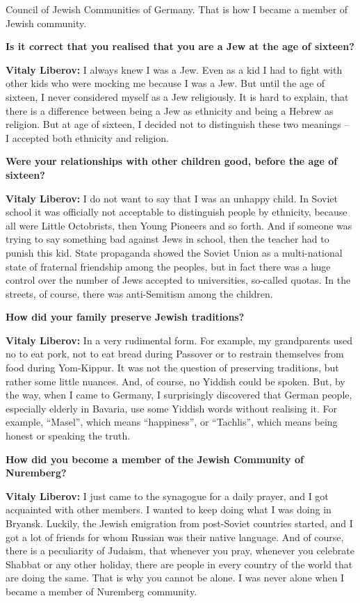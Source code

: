 Council of Jewish Communities of Germany. That is how I became a member of Jewish community.  

\textbf{Is it correct that you realised that you are a Jew at the age of sixteen?} 

\textbf{Vitaly Liberov:} I always knew I was a Jew. Even as a kid I had to fight with other kids who were mocking me because I was a Jew. But until the age of sixteen, I never considered myself as a Jew religiously. It is hard to explain, that there is a difference between being a Jew as ethnicity and being a Hebrew as religion. But at age of sixteen, I decided not to distinguish these two meanings – I accepted both ethnicity and religion.  

\textbf{Were your relationships with other children good, before the age of sixteen?} 

\textbf{Vitaly Liberov:} I do not want to say that I was an unhappy child. In Soviet school it was officially not acceptable to distinguish people by ethnicity, because all were Little Octobrists, then Young Pioneers and so forth. And if someone was trying to say something bad against Jews in school, then the teacher had to punish this kid. State propaganda showed the Soviet Union as a multi-national state of fraternal friendship among the peoples, but in fact there was a huge control over the number of Jews accepted to universities, so-called quotas. In the streets, of course, there was anti-Semitism among the children.  

\textbf{How did your family preserve Jewish traditions?} 

\textbf{Vitaly Liberov:} In a very rudimental form. For example, my grandparents used no to eat pork, not to eat bread during Passover or to restrain themselves from food during Yom-Kippur. It was not the question of preserving traditions, but rather some little nuances. And, of course, no Yiddish could be spoken. But, by the way, when I came to Germany, I surprisingly discovered that German people, especially elderly in Bavaria, use some Yiddish words without realising it. For example, ``Masel'', which means ``happiness'', or ``Tachlis'', which means being honest or speaking the truth.  

\textbf{How did you become a member of the Jewish Community of Nuremberg?} 

\textbf{Vitaly Liberov:} I just came to the synagogue for a daily prayer, and I got acquainted with other members. I wanted to keep doing what I was doing in Bryansk. Luckily, the Jewish emigration from post-Soviet countries started, and I got a lot of friends for whom Russian was their native language. And of course, there is a peculiarity of Judaism, that whenever you pray, whenever you celebrate Shabbat or any other holiday, there are people in every country of the world that are doing the same. That is why you cannot be alone. I was never alone when I became a member of Nuremberg community.  

